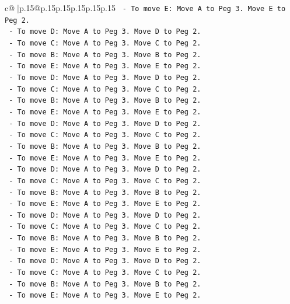 \documentclass{article}
\begin{document}
{\begin{supertabular}{c@{$\;$}|p{.15\linewidth}@{}p{.15\linewidth}p{.15\linewidth}p{.15\linewidth}p{.15\linewidth}p{.15\linewidth}}
{{{\texttt{    {-}   To move E: Move A to Peg 3. Move E to Peg 2.} \\
\texttt{    {-}   To move D: Move A to Peg 3. Move D to Peg 2.} \\
\texttt{    {-}   To move C: Move A to Peg 3. Move C to Peg 2.} \\
\texttt{    {-}   To move B: Move A to Peg 3. Move B to Peg 2.} \\
\texttt{    {-}   To move E: Move A to Peg 3. Move E to Peg 2.} \\
\texttt{    {-}   To move D: Move A to Peg 3. Move D to Peg 2.} \\
\texttt{    {-}   To move C: Move A to Peg 3. Move C to Peg 2.} \\
\texttt{    {-}   To move B: Move A to Peg 3. Move B to Peg 2.} \\
\texttt{    {-}   To move E: Move A to Peg 3. Move E to Peg 2.} \\
\texttt{    {-}   To move D: Move A to Peg 3. Move D to Peg 2.} \\
\texttt{    {-}   To move C: Move A to Peg 3. Move C to Peg 2.} \\
\texttt{    {-}   To move B: Move A to Peg 3. Move B to Peg 2.} \\
\texttt{    {-}   To move E: Move A to Peg 3. Move E to Peg 2.} \\
\texttt{    {-}   To move D: Move A to Peg 3. Move D to Peg 2.} \\
\texttt{    {-}   To move C: Move A to Peg 3. Move C to Peg 2.} \\
\texttt{    {-}   To move B: Move A to Peg 3. Move B to Peg 2.} \\
\texttt{    {-}   To move E: Move A to Peg 3. Move E to Peg 2.} \\
\texttt{    {-}   To move D: Move A to Peg 3. Move D to Peg 2.} \\
\texttt{    {-}   To move C: Move A to Peg 3. Move C to Peg 2.} \\
\texttt{    {-}   To move B: Move A to Peg 3. Move B to Peg 2.} \\
\texttt{    {-}   To move E: Move A to Peg 3. Move E to Peg 2.} \\
\texttt{    {-}   To move D: Move A to Peg 3. Move D to Peg 2.} \\
\texttt{    {-}   To move C: Move A to Peg 3. Move C to Peg 2.} \\
\texttt{    {-}   To move B: Move A to Peg 3. Move B to Peg 2.} \\
\texttt{    {-}   To move E: Move A to Peg 3. Move E to Peg 2.} \\
}}}
\end{supertabular}}
\end{document}
